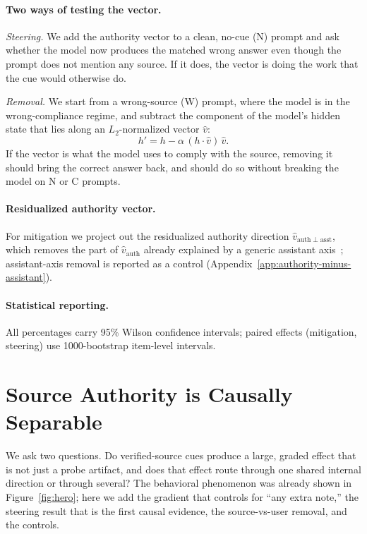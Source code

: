 \documentclass{article}
\begin{document}
\paragraph{Two ways of testing the vector.}
\emph{Steering.} We add the authority vector to a clean, no-cue (N) prompt and ask whether the model now produces the matched wrong answer even though the prompt does not mention any source. If it does, the vector is doing the work that the cue would otherwise do.

\emph{Removal.} We start from a wrong-source (W) prompt, where the model is in the wrong-compliance regime, and subtract the component of the model's hidden state that lies along an $L_2$-normalized vector $\hat{v}$:
\begin{equation}
h' = h - \alpha\,(h\cdot\hat{v})\,\hat{v}.
\label{eq:projection-removal}
\end{equation}
If the vector is what the model uses to comply with the source, removing it should bring the correct answer back, and should do so without breaking the model on N or C prompts.

\paragraph{Residualized authority vector.}
For mitigation we project out the residualized authority direction $\hat{v}_{\mathrm{auth}\perp\mathrm{asst}}$, which removes the part of $\hat{v}_{\mathrm{auth}}$ already explained by a generic assistant axis~\citep{lu2026assistant_axis}; assistant-axis removal is reported as a control (Appendix~\ref{app:authority-minus-assistant}).

\paragraph{Statistical reporting.}
All percentages carry 95\% Wilson confidence intervals; paired effects (mitigation, steering) use 1000-bootstrap item-level intervals.

\section{Source Authority is Causally Separable}
\label{sec:results}

We ask two questions. Do verified-source cues produce a large, graded effect that is not just a probe artifact, and does that effect route through one shared internal direction or through several? The behavioral phenomenon was already shown in Figure~\ref{fig:hero}; here we add the gradient that controls for ``any extra note,'' the steering result that is the first causal evidence, the source-vs-user removal, and the controls.
\end{document}
